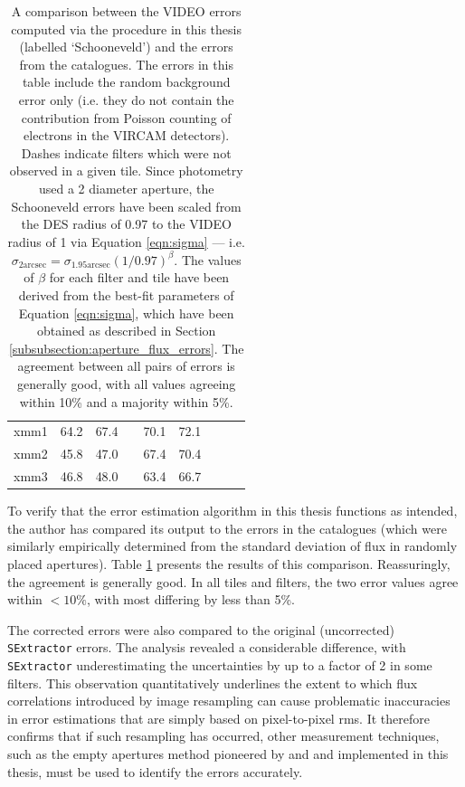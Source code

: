 \begin{table}[!p]
\begin{tabular}{lcccccccc}
xmm1 & 64.2 & 67.4 & & 70.1 & 72.1 & & & \\
xmm2 & 45.8 & 47.0 & & 67.4 & 70.4 & & & \\
xmm3 & 46.8 & 48.0 & & 63.4 & 66.7 & & & \\
\bottomrule
\end{tabular}
\vspace{1em}
\caption[Comparison of photometric uncertainties]{A comparison between the VIDEO errors computed via the procedure in this thesis (labelled `Schooneveld') and the errors from the \cite{2013MNRAS.428.1281J} catalogues. The \cite{2013MNRAS.428.1281J} errors in this table include the random background error only (i.e. they do not contain the contribution from Poisson counting of electrons in the VIRCAM detectors). Dashes indicate filters which were not observed in a given tile. Since \cite{2013MNRAS.428.1281J} photometry used a \SI{2}{\arcsec} diameter aperture, the Schooneveld errors have been scaled from the DES radius of \SI{0.97}{\arcsec} to the VIDEO radius of \SI{1}{\arcsec} via Equation \ref{eqn:sigma} --- i.e. $\sigma_{\mathrm{2arcsec}} = \sigma_{\mathrm{1.95arcsec}} (1/0.97)^{\beta}$. The values of $\beta$ for each filter and tile have been derived from the best-fit parameters of Equation \ref{eqn:sigma}, which have been obtained as described in Section \ref{subsubsection:aperture_flux_errors}. The agreement between all pairs of errors is generally good, with all values agreeing within 10\% and a majority within 5\%. }
\label{table:error_agreement}
\end{table}

 

To verify that the error estimation algorithm in this thesis functions as intended, the author has compared its output to the errors in the \cite{2013MNRAS.428.1281J} catalogues (which were similarly empirically determined from the standard deviation of flux in randomly placed apertures). Table \ref{table:error_agreement} presents the results of this comparison. Reassuringly, the agreement is generally good. In all tiles and filters, the two error values agree within $<10 \%$, with most differing by less than 5\%. \par

The corrected errors were also compared to the original (uncorrected) \texttt{SExtractor} errors. The analysis revealed a considerable difference, with \texttt{SExtractor} underestimating the uncertainties by up to a factor of 2 in some filters. This observation quantitatively underlines the extent to which flux correlations introduced by image resampling can cause problematic inaccuracies in error estimations that are simply based on pixel-to-pixel rms. It therefore confirms that if such resampling has occurred, other measurement techniques, such as the empty apertures method pioneered by \cite{2003AJ....125.1107L} and \cite{2006ApJS..162....1G} and implemented in this thesis, must be used to identify the errors accurately. \par 



